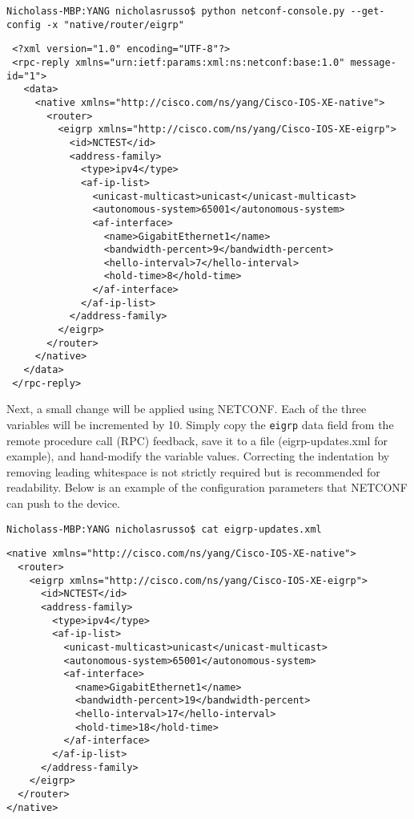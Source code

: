 \begin{verbatim}
Nicholass-MBP:YANG nicholasrusso$ python netconf-console.py --get-config -x "native/router/eigrp"
\end{verbatim}

\begin{verbatim}
 <?xml version="1.0" encoding="UTF-8"?>
 <rpc-reply xmlns="urn:ietf:params:xml:ns:netconf:base:1.0" message-id="1">
   <data>
     <native xmlns="http://cisco.com/ns/yang/Cisco-IOS-XE-native">
       <router>
         <eigrp xmlns="http://cisco.com/ns/yang/Cisco-IOS-XE-eigrp">
           <id>NCTEST</id>
           <address-family>
             <type>ipv4</type>
             <af-ip-list>
               <unicast-multicast>unicast</unicast-multicast>
               <autonomous-system>65001</autonomous-system>
               <af-interface>
                 <name>GigabitEthernet1</name>
                 <bandwidth-percent>9</bandwidth-percent>
                 <hello-interval>7</hello-interval>
                 <hold-time>8</hold-time>
               </af-interface>
             </af-ip-list>
           </address-family>
         </eigrp>
       </router>
     </native>
   </data>
 </rpc-reply>
\end{verbatim}

Next, a small change will be applied using NETCONF. Each of the three
variables will be incremented by 10. Simply copy the \verb|eigrp| data field from
the remote procedure call (RPC) feedback, save it to a file (eigrp-updates.xml
for example), and hand-modify the variable values. Correcting the indentation
by removing leading whitespace is not strictly required but is recommended for
readability. Below is an example of the configuration parameters that NETCONF
can push to the device.

\begin{verbatim}
Nicholass-MBP:YANG nicholasrusso$ cat eigrp-updates.xml
\end{verbatim}

\begin{verbatim}
<native xmlns="http://cisco.com/ns/yang/Cisco-IOS-XE-native">
  <router>
    <eigrp xmlns="http://cisco.com/ns/yang/Cisco-IOS-XE-eigrp">
      <id>NCTEST</id>
      <address-family>
        <type>ipv4</type>
        <af-ip-list>
          <unicast-multicast>unicast</unicast-multicast>
          <autonomous-system>65001</autonomous-system>
          <af-interface>
            <name>GigabitEthernet1</name>
            <bandwidth-percent>19</bandwidth-percent>
            <hello-interval>17</hello-interval>
            <hold-time>18</hold-time>
          </af-interface>
        </af-ip-list>
      </address-family>
    </eigrp>
  </router>
</native>
\end{verbatim}

